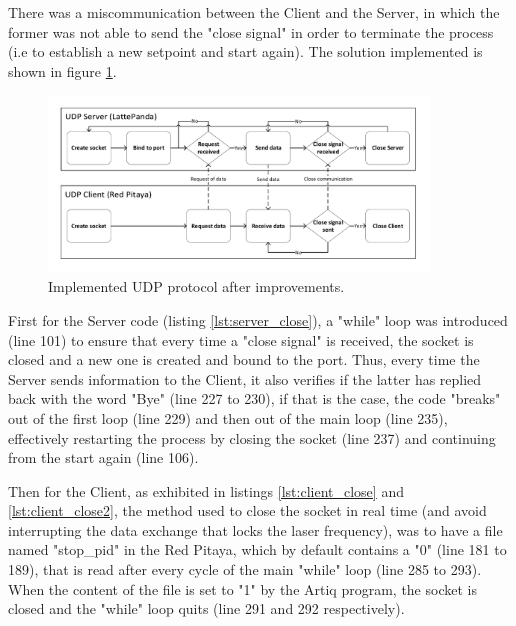 \documentclass[a4paper,12pt]{article}
\newlength{\gobble}
\begin{document}
\newpage
There was a miscommunication between the Client and the Server, in which the former was not able to send the "close signal" in order to terminate the process (i.e to establish a new setpoint and start again). The solution implemented is shown in figure \ref{fig:udp_after}.

\begin{figure}[!h]
    \centering
    \includegraphics[width=0.9\textwidth]{Images/UDP_after.pdf}
    \captionsetup{justification=centering}
    \caption{Implemented UDP protocol after improvements.}
    \label{fig:udp_after}
\end{figure}

First for the Server code (listing \ref{lst:server_close}), a "while" loop was introduced (line 101) to ensure that every time a "close signal" is received, the socket is closed and a new one is created and bound to the port. Thus, every time the Server sends information to the Client, it also verifies if the latter has replied back with the word "Bye" (line 227 to 230), if that is the case, the code "breaks" out of the first loop (line 229) and then out of the main loop (line 235), effectively restarting the process by closing the socket (line 237) and continuing from the start again (line 106).

\pagebreak
 \vspace{0.4cm}

Then for the Client, as exhibited in listings \ref{lst:client_close} and  \ref{lst:client_close2}, the method used to close the socket in real time (and avoid interrupting the data exchange that locks the laser frequency), was to have a file named "stop\_pid" in the Red Pitaya, which by default contains a "0" (line 181 to 189), that is read after every cycle of the main "while" loop (line 285 to 293). When the content of the file is set to "1" by the Artiq program, the socket is closed and the "while" loop quits (line 291 and 292 respectively). 
 \vspace{0.4cm}
\end{document}
